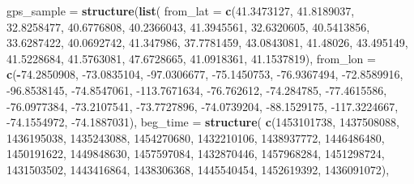 \documentclass[12pt]{book}
\newenvironment{Shaded}{\begin{snugshade}}{\end{snugshade}}
\newcommand{\DataTypeTok}[1]{\textcolor[rgb]{0.13,0.29,0.53}{#1}}
\newcommand{\DecValTok}[1]{\textcolor[rgb]{0.00,0.00,0.81}{#1}}
\newcommand{\FloatTok}[1]{\textcolor[rgb]{0.00,0.00,0.81}{#1}}
\newcommand{\KeywordTok}[1]{\textcolor[rgb]{0.13,0.29,0.53}{\textbf{#1}}}
\newcommand{\NormalTok}[1]{#1}
\newcommand{\OperatorTok}[1]{\textcolor[rgb]{0.81,0.36,0.00}{\textbf{#1}}}
\newcommand{\StringTok}[1]{\textcolor[rgb]{0.31,0.60,0.02}{#1}}
\numberwithin{equation}{chapter}
\begin{document}
\begin{Shaded}
\begin{Highlighting}[]
\NormalTok{gps_sample =}\StringTok{ }
\StringTok{  }\KeywordTok{structure}\NormalTok{(}\KeywordTok{list}\NormalTok{(}
    \DataTypeTok{from_lat =} \KeywordTok{c}\NormalTok{(}\FloatTok{41.3473127}\NormalTok{, }\FloatTok{41.8189037}\NormalTok{, }\FloatTok{32.8258477}\NormalTok{, }\FloatTok{40.6776808}\NormalTok{, }
                 \FloatTok{40.2366043}\NormalTok{, }\FloatTok{41.3945561}\NormalTok{, }\FloatTok{32.6320605}\NormalTok{, }\FloatTok{40.5413856}\NormalTok{, }
                 \FloatTok{33.6287422}\NormalTok{, }\FloatTok{40.0692742}\NormalTok{, }\FloatTok{41.347986}\NormalTok{, }\FloatTok{37.7781459}\NormalTok{, }
                 \FloatTok{43.0843081}\NormalTok{, }\FloatTok{41.48026}\NormalTok{, }\FloatTok{43.495149}\NormalTok{, }\FloatTok{41.5228684}\NormalTok{, }
                 \FloatTok{41.5763081}\NormalTok{, }\FloatTok{47.6728665}\NormalTok{, }\FloatTok{41.0918361}\NormalTok{, }\FloatTok{41.1537819}\NormalTok{),}
    \DataTypeTok{from_lon =} \KeywordTok{c}\NormalTok{(}\OperatorTok{-}\FloatTok{74.2850908}\NormalTok{, }\FloatTok{-73.0835104}\NormalTok{, }\FloatTok{-97.0306677}\NormalTok{, }\FloatTok{-75.1450753}\NormalTok{,}
                 \FloatTok{-76.9367494}\NormalTok{, }\FloatTok{-72.8589916}\NormalTok{, }\FloatTok{-96.8538145}\NormalTok{, }\FloatTok{-74.8547061}\NormalTok{, }
                 \FloatTok{-113.7671634}\NormalTok{, }\FloatTok{-76.762612}\NormalTok{, }\FloatTok{-74.284785}\NormalTok{, }\FloatTok{-77.4615586}\NormalTok{, }
                 \FloatTok{-76.0977384}\NormalTok{, }\FloatTok{-73.2107541}\NormalTok{, }\FloatTok{-73.7727896}\NormalTok{, }\FloatTok{-74.0739204}\NormalTok{, }
                 \FloatTok{-88.1529175}\NormalTok{, }\FloatTok{-117.3224667}\NormalTok{, }\FloatTok{-74.1554972}\NormalTok{, }\FloatTok{-74.1887031}\NormalTok{), }
    \DataTypeTok{beg_time =} \KeywordTok{structure}\NormalTok{(}
      \KeywordTok{c}\NormalTok{(}\DecValTok{1453101738}\NormalTok{, }\DecValTok{1437508088}\NormalTok{, }\DecValTok{1436195038}\NormalTok{, }\DecValTok{1435243088}\NormalTok{, }\DecValTok{1454270680}\NormalTok{, }
        \DecValTok{1432210106}\NormalTok{, }\DecValTok{1438937772}\NormalTok{, }\DecValTok{1446486480}\NormalTok{, }\DecValTok{1450191622}\NormalTok{, }\DecValTok{1449848630}\NormalTok{, }
        \DecValTok{1457597084}\NormalTok{, }\DecValTok{1432870446}\NormalTok{, }\DecValTok{1457968284}\NormalTok{, }\DecValTok{1451298724}\NormalTok{, }\DecValTok{1431503502}\NormalTok{, }
        \DecValTok{1443416864}\NormalTok{, }\DecValTok{1438306368}\NormalTok{, }\DecValTok{1445540454}\NormalTok{, }\DecValTok{1452619392}\NormalTok{, }\DecValTok{1436091072}\NormalTok{), }

\end{Highlighting}
\end{Shaded}
\end{document}
